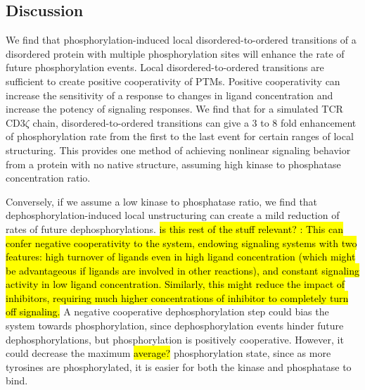 \documentclass[../../AdvancementSummary.tex]{subfiles}
\begin{document}
\subsection{Discussion}


We find that phosphorylation-induced local disordered-to-ordered transitions of a disordered protein with multiple phosphorylation sites will enhance the rate of future phosphorylation events. Local disordered-to-ordered transitions are sufficient to create positive cooperativity of PTMs. Positive cooperativity can increase the sensitivity of a response to changes in ligand concentration and increase the potency of signaling responses. We find that for a simulated TCR CD3$\zeta$ chain, disordered-to-ordered transitions can give a 3 to 8 fold enhancement of phosphorylation rate from the first to the last event for certain ranges of local structuring. This provides one method of achieving nonlinear signaling behavior from a protein with no native structure, assuming high kinase to phosphatase concentration ratio. 

Conversely, if we assume a low kinase to phosphatase ratio, we find that dephosphorylation-induced local unstructuring can create a mild reduction of rates of future dephosphorylations. \hl{is this rest of the stuff relevant? : This can confer negative cooperativity to the system, endowing signaling systems with two features: high turnover of ligands even in high ligand concentration (which might be advantageous if ligands are involved in other reactions), and constant signaling activity in low ligand concentration. Similarly, this might reduce the impact of inhibitors, requiring much higher concentrations of inhibitor to completely turn off signaling.} A negative cooperative dephosphorylation step could bias the system towards phosphorylation, since dephosphorylation events hinder future dephosphorylations, but phosphorylation is positively cooperative. However, it could decrease the maximum \hl{average?} phosphorylation state, since as more tyrosines are phosphorylated, it is easier for both the kinase and phosphatase to bind. 
\end{document}
